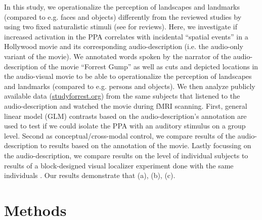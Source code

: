 \documentclass[english]{article}
\begin{document}
In this study, we operationalize the perception of landscapes and landmarks
(compared to e.g. faces and objects) differently from the reviewed studies by
using two fixed naturalistic stimuli (see \citep{hamilton2018revolution,
hasson2008neurocinematics, sonkusare2019naturalistic} for reviews).
Here, we investigate if increased activation in the PPA correlates with
incidental ``spatial events'' in a Hollywood movie and its corresponding
audio-description (i.e. the audio-only variant of the movie).
We annotated words spoken by the narrator of the audio-description of the movie
``Forrest Gump'' \citep{ForrestGumpMovie} as well as cuts and depicted locations
in the audio-visual movie to be able to operationalize the perception of
landscapes and landmarks (compared to e.g. persons and objects).
We then analyze publicly available data
(\href{http://www.studyforrest.org}{studyforrest.org}) from the same subjects
that listened to the audio-description and watched the movie during fMRI
scanning.
First, general linear model (GLM) contrasts based on the audio-description's
annotation are used to test if we could isolate the PPA with an auditory
stimulus on a group level.
Second as conceptual/cross-modal control, we compare results of the
audio-description to results based on the annotation of the movie.
Lastly focussing on the audio-description, we compare results on the level of
individual subjects to results of a block-designed visual localizer experiment
done with the same individuals \citep{sengupta2016extension}.
Our results demonstrate that (a), (b), (c).



\section{Methods}



\end{document}
